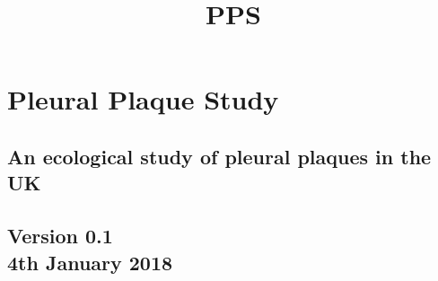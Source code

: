 \documentclass[a4paper,10pt]{article}
\title{\bf PPS}
\date{}
\begin{document}
\pagestyle{fancy} 
\maketitle

\section*{Pleural Plaque Study}
 \subsection*{An ecological study of pleural plaques in the UK}

\vspace{3cm}

\begin{centering}
\subsection*{Version 0.1 \\ 4th January 2018}
\end{centering}
\end{document}
